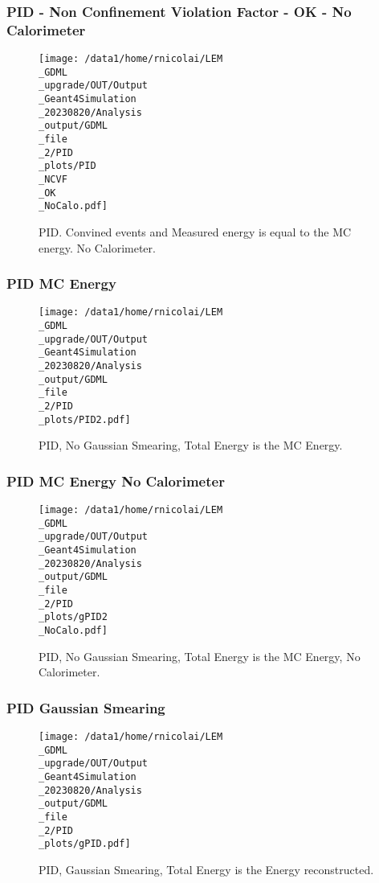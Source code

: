 \documentclass[8pt]{beamer}
\begin{document}
            \begin{frame}
                \frametitle{PID - Non Confinement Violation Factor - OK - No Calorimeter}
            
        \begin{figure}[h]
            \centering
            \texttt{[image: /data1/home/rnicolai/LEM\\\_GDML\\\_upgrade/OUT/Output\\\_Geant4Simulation\\\_20230820/Analysis\\\_output/GDML\\\_file\\\_2/PID\\\_plots/PID\\\_NCVF\\\_OK\\\_NoCalo.pdf]}
            \caption{PID. Convined events and Measured energy is equal to the MC energy. No Calorimeter.}
        \end{figure}
        
            \end{frame}
            
            \begin{frame}
                \frametitle{PID MC Energy}
            
        \begin{figure}[h]
            \centering
            \texttt{[image: /data1/home/rnicolai/LEM\\\_GDML\\\_upgrade/OUT/Output\\\_Geant4Simulation\\\_20230820/Analysis\\\_output/GDML\\\_file\\\_2/PID\\\_plots/PID2.pdf]}
            \caption{PID, No Gaussian Smearing, Total Energy is the MC Energy.}
        \end{figure}
        
            \end{frame}
            
            \begin{frame}
                \frametitle{PID MC Energy No Calorimeter}
            
        \begin{figure}[h]
            \centering
            \texttt{[image: /data1/home/rnicolai/LEM\\\_GDML\\\_upgrade/OUT/Output\\\_Geant4Simulation\\\_20230820/Analysis\\\_output/GDML\\\_file\\\_2/PID\\\_plots/gPID2\\\_NoCalo.pdf]}
            \caption{PID, No Gaussian Smearing, Total Energy is the MC Energy, No Calorimeter.}
        \end{figure}
        
            \end{frame}
            
            \begin{frame}
                \frametitle{PID Gaussian Smearing}
            
        \begin{figure}[h]
            \centering
            \texttt{[image: /data1/home/rnicolai/LEM\\\_GDML\\\_upgrade/OUT/Output\\\_Geant4Simulation\\\_20230820/Analysis\\\_output/GDML\\\_file\\\_2/PID\\\_plots/gPID.pdf]}
            \caption{PID, Gaussian Smearing, Total Energy is the Energy reconstructed.}
        \end{figure}
        
            \end{frame}
            
\end{document}
